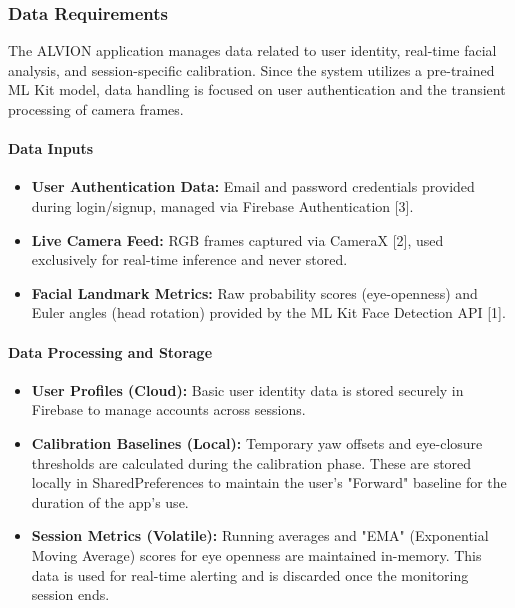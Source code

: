 \documentclass[11pt]{report}
\begin{document}
\subsubsection{Data Requirements}
The ALVION application manages data related to user identity, real-time facial analysis, and session-specific calibration. Since the system utilizes a pre-trained ML Kit model, data handling is focused on user authentication and the transient processing of camera frames.

\paragraph{Data Inputs}
\begin{itemize}
    \item \textbf{User Authentication Data:} Email and password credentials provided during login/signup, managed via Firebase Authentication [3].
    \item \textbf{Live Camera Feed:} RGB frames captured via CameraX [2], used exclusively for real-time inference and never stored.
    \item \textbf{Facial Landmark Metrics:} Raw probability scores (eye-openness) and Euler angles (head rotation) provided by the ML Kit Face Detection API [1].
\end{itemize}

\paragraph{Data Processing and Storage}
\begin{itemize}
    \item \textbf{User Profiles (Cloud):} Basic user identity data is stored securely in Firebase to manage accounts across sessions.
    \item \textbf{Calibration Baselines (Local):} Temporary yaw offsets and eye-closure thresholds are calculated during the calibration phase. These are stored locally in SharedPreferences to maintain the user's "Forward" baseline for the duration of the app's use.
    \item \textbf{Session Metrics (Volatile):} Running averages and "EMA" (Exponential Moving Average) scores for eye openness are maintained in-memory. This data is used for real-time alerting and is discarded once the monitoring session ends.
\end{itemize}
\end{document}
